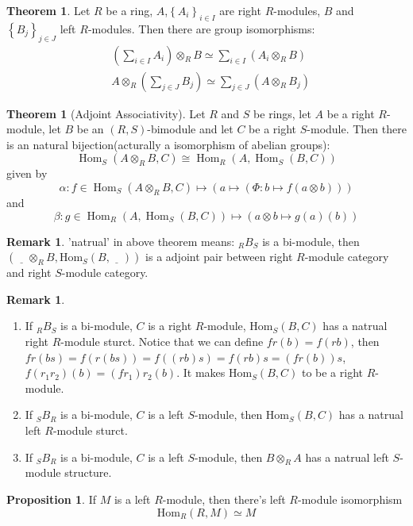 \documentclass[a4paper,12pt]{article}
\newcommand{\bbrace}[1]{\left\{ #1 \right\} }
\theoremstyle{definition}
\newtheorem{theo}[defn]{Theorem}
\newtheorem{rema}[defn]{Remark}
\newtheorem{prop}[defn]{Proposition}
\begin{document}
\begin{theo}
    Let $R$ be a ring, $A$,$\bbrace{A_i}_{i\in I}$ are right $R$-modules, $B$ and $\bbrace{B_j}_{j\in J}$ left $R$-modules. Then there are group isomorphisms:
    \begin{align*}
         & \left(\sum_{i \in I} A_i\right) \otimes_{R} B \simeq \sum_{i \in I}\left(A_i \otimes_{R} B\right) \\
         & A \otimes_{R}\left(\sum_{j \in J} B_j\right) \simeq \sum_{j \in J}\left(A \otimes_{R} B_j\right)
    \end{align*}
\end{theo}
\begin{theo}[Adjoint Associativity]
    Let $R$ and $S$ be rings, let $A$ be a right $R$-module, let $B$ be an $(R, S)$-bimodule and let $C$ be a right $S$-module. Then there is an natural bijection(acturally a isomorphism of abelian groups):
    $$
        \operatorname{Hom}_S\left(A \otimes_R B, C\right) \cong \operatorname{Hom}_R\left(A, \operatorname{Hom}_S(B, C)\right)
    $$
    given by
    \begin{equation*}
        \alpha:f\in \operatorname{Hom}_S\left(A \otimes_R B, C\right) \mapsto (a\mapsto (\Phi:b\mapsto f(a\otimes b)))
    \end{equation*}
    and
    \begin{equation*}
        \beta :g\in \operatorname{Hom}_R\left(A, \operatorname{Hom}_S(B, C)\right)\mapsto (a\otimes b\mapsto g(a)(b))
    \end{equation*}
\end{theo}
\begin{rema}
    'natrual' in above theorem means: $_{R}B_S$ is a bi-module, then\\
    $(\underline{\quad}\otimes_R B,\text{Hom}_S(B,\underline{\quad}))$ is a adjoint pair between right $R$-module category and right $S$-module category.
\end{rema}
\begin{rema}
    \begin{enumerate}[(1)]
        \item If $_{R}B_S$ is a bi-module, $C$ is a right $R$-module, $\text{Hom}_S(B,C)$ has a natrual right $R$-module sturct. Notice that we can define $fr(b)=f(rb)$, then $fr(bs)=f(r(bs))=f((rb)s)=f(rb)s=(fr(b))s$,$f(r_1 r_2)(b)=(fr_1)r_2(b)$. It makes $\text{Hom}_S(B,C)$ to be a right $R$-module.
        \item If $_{S}B_R$ is a bi-module, $C$ is a left $S$-module, then $\text{Hom}_S(B,C)$ has a natrual left $R$-module sturct.
        \item If $_{S}B_R$ is a bi-module, $C$ is a left $S$-module, then $B\otimes_R A$ has a natrual left $S$-module structure.
    \end{enumerate}
\end{rema}
\begin{prop}
    If $M$ is a left $R$-module, then there's left $R$-module isomorphism $$\text{Hom}_R(R,M)\simeq M$$
\end{prop}
\end{document}
